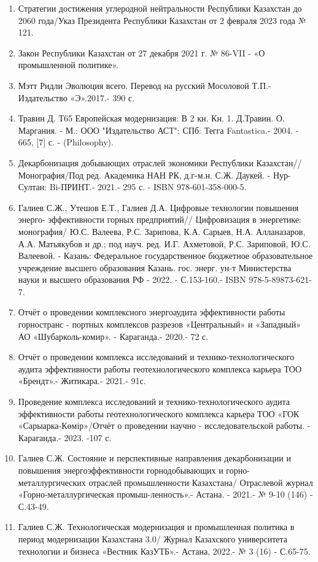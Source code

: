 \begin{enumerate}
\item
Стратегии достижения углеродной нейтральности Республики Казахстан до
2060 года/Указ Президента Республики Казахстан от 2 февраля 2023 года № 121.

\item
Закон Республики Казахстан от 27 декабря 2021 г. № 86-VII - «О
промышленной политике».

\item
Мэтт Ридли Эволюция всего. Перевод на русский Мосоловой Т.П.-
Издательство «Э».2017.- 390 с.

\item
Травин Д. Т65 Европейская модернизация: В 2 кн. Кн. 1. Д.Травин. О.
Маргания. - М.: ООО "Издательство АСТ"; СПб: Тегга Fantastica.- 2004. - 665, {[}7{]} с.
- (Philosophy).

\item
Декарбонизация добывающих отраслей экономики Республики Казахстан//
Монография/Под ред. Академика НАН РК, д.г-м.н. С.Ж. Даукей. -
Нур-Султан: Bi-ПРИНТ.- 2021.- 295 с. - ISBN 978-601-358-000-5.

\item
Галиев С.Ж., Утешов Е.Т., Галиев Д.А. Цифровые технологии повышения
энерго- эффективности горных предприятий// Цифровизация в энергетике:
монография/ Ю.С. Валеева, Р.С. Зарипова, К.А. Сарыев, Н.А. Алланазаров,
А.А. Матьякубов и др.; под науч. ред. И.Г. Ахметовой, Р.С. Зариповой,
Ю.С. Валеевой. - Казань: Федеральное государственное бюджетное
образовательное учреждение высшего образования Казань. гос. энерг. ун-т
Министерства науки и высшего образования РФ - 2022. - С.153-160.- ISBN
978-5-89873-621-7.

\item
Отчёт о проведении комплексного энергоаудита эффективности работы
горностранс - портных комплексов разрезов «Центральный» и «Западный» АО
«Шубарколь-комир». - Караганда.- 2020.- 72 с.

\item
Отчёт о проведении комплекса исследований и технико-технологического
аудита эффективности работы геотехнологического комплекса карьера ТОО
«Брендт».- Житикара.- 2021.- 91с.

\item
Проведение комплекса исследований и технико-технологического аудита
эффективности работы геотехнологического комплекса карьера ТОО «ГОК
«Сарыарка-Көмір»/Отчёт о проведении научно - исследовательской работы. -
Караганда.- 2023. -107 с.

\item
Галиев С.Ж. Состояние и перспективные направления декарбонизации и
повышения энергоэффективности горнодобывающих и горно-металлургических
отраслей промышленности Казахстана/ Отраслевой журнал
«Горно-металлургическая промыш-ленность».- Астана. - 2021.- № 9-10 (146)
- С.43-49.

\item
Галиев С.Ж. Технологическая модернизация и промышленная политика в
период модернизации Казахстана 3.0/ Журнал Казахского университета
технологии и бизнеса «Вестник КазУТБ».- Астана, 2022.- № 3 (16) -
С.65-75.
\end{enumerate}

